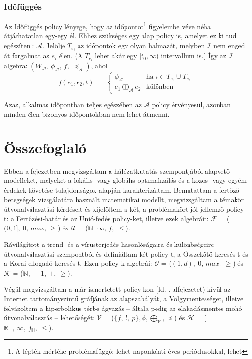       \subsubsection{Időfüggés}
      Az Időfüggés policy lényege, hogy az időpontot\footnote{A lépték mértéke problémafüggő: lehet naponkénti éves periódusokkal, lehet } figyelembe véve néha átjárhatatlan egy-egy él. Ehhez szükséges egy alap policy is, amelyet ez ki tud egészíteni: $\mathcal{A}$. Jelölje $T_{e_i}$ az időpontok egy olyan halmazát, melyben $\mathcal{I}$ nem enged át forgalmat az $e_i$ élen. (A $T_{e_i}$ lehet akár egy $[t_0, \infty)$ intervallum is.) Így az $\mathcal{I}$ algebra: $(W_{\mathcal{A}},~\phi_{\mathcal{A}},~f,~\preceq_{\mathcal{A}})$, ahol
      $$f(e_1,e_2,t)~=~
      \begin{cases}
        \phi_{\mathcal{A}} & \text{ha } t \in T_{e_1} \cup T_{e_2}\\
        e_1 \bigoplus_{\mathcal{A}} e_2 & \text{különben}
      \end{cases}$$

      Azaz, alkalmas időpontban teljes egészében az $\mathcal{A}$ policy érvényesül, azonban minden élen bizonyos időpontokban nem lehet átmenni.\\

  \section{Összefoglaló}
  Ebben a fejezetben megvizsgáltam a hálózatkutatás szempontjából alapvető modelleket, melyeket a lokális- vagy globális optimalizálás és a közös- vagy egyéni érdekek követése tulajdonságok alapján karakterizáltam. Bemutattam a fertőző betegségek vizsgálatára használt matematikai modellt, megvizsgáltam a témakör útvonalválasztási kérdéseit és kijelöltem a két, a problémakört jól jellemző policy-t: a Fertőzési-határ és az Unió-fedés policy-ket, illetve ezek algebráit: $\mathcal{F}$ = ($(0,1],~0,~max,~\geq$) és $\mathcal{U}$ = ($\mathbb{N},~\infty,~f,~\leq$).

  Rávilágított a trend- és a vírusterjedés hasonlóságaira és különbségeire útvonalválasztási szempontból és definiáltam két policy-t, a Összekötő-keresés-t és a Korai-elfogadó-keresés-t. Ezen policy-k algebrái: $\mathcal{O}$ = ($(1,d),~0,~max,~\geq$) és $\mathcal{K}$ = ($\mathbb{N},~-1,~+,~\geq$).

  Végül megvizsgáltam a már ismertetett policy-kon (ld. . alfejezetet) kívül az Internet tartományszintű gráfjának az alapszabályát, a Völgymentességet, illetve felvázoltam a hiperbolikus térbe ágyazás -- általa pedig az elakadásmentes mohó útvonalválasztás -- lehetőségét: $\mathcal{V}$ = ($\{f,~l,~p\},\phi,\bigoplus_{\mathcal{V}},\preceq$) és $\mathcal{H}$ = ($\mathbb{R}^{+},~\infty,~f_{\mathbb{H}},~\leq$).
